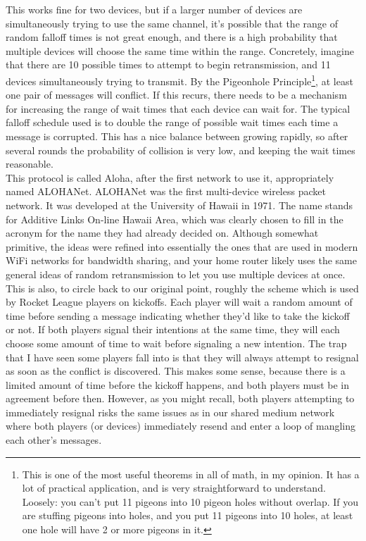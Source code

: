 \documentclass{article}
\begin{document}
This works fine for two devices, but if a larger number of devices are simultaneously trying to use the same channel, it's possible that the range of random falloff times is not great enough, and there is a high probability that multiple devices will choose the same time within the range. Concretely, imagine that there are 10 possible times to attempt to begin retransmission, and 11 devices simultaneously trying to transmit. By the Pigeonhole Principle\footnote{This is one of the most useful theorems in all of math, in my opinion. It has a lot of practical application, and is very straightforward to understand. Loosely: you can't put 11 pigeons into 10 pigeon holes without overlap. If you are stuffing pigeons into holes, and you put 11 pigeons into 10 holes, at least one hole will have 2 or more pigeons in it.}, at least one pair of messages will conflict. If this recurs, there needs to be a mechanism for increasing the range of wait times that each device can wait for. The typical falloff schedule used is to double the range of possible wait times each time a message is corrupted. This has a nice balance between growing rapidly, so after several rounds the probability of collision is very low, and keeping the wait times reasonable.\\

This protocol is called Aloha, after the first network to use it, appropriately named ALOHANet. ALOHANet was the first multi-device wireless packet network. It was developed at the University of Hawaii in 1971. The name stands for Additive Links On-line Hawaii Area, which was clearly chosen to fill in the acronym for the name they had already decided on. Although somewhat primitive, the ideas were refined into essentially the ones that are used in modern WiFi networks for bandwidth sharing, and your home router likely uses the same general ideas of random retransmission to let you use multiple devices at once.\\

This is also, to circle back to our original point, roughly the scheme which is used by Rocket League players on kickoffs. Each player will wait a random amount of time before sending a message indicating whether they'd like to take the kickoff or not. If both players signal their intentions at the same time, they will each choose some amount of time to wait before signaling a new intention. The trap that I have seen some players fall into is that they will always attempt to resignal as soon as the conflict is discovered. This makes some sense, because there is a limited amount of time before the kickoff happens, and both players must be in agreement before then. However, as you might recall, both players attempting to immediately resignal risks the same issues as in our shared medium network where both players (or devices) immediately resend and enter a loop of mangling each other's messages.\\
\end{document}
